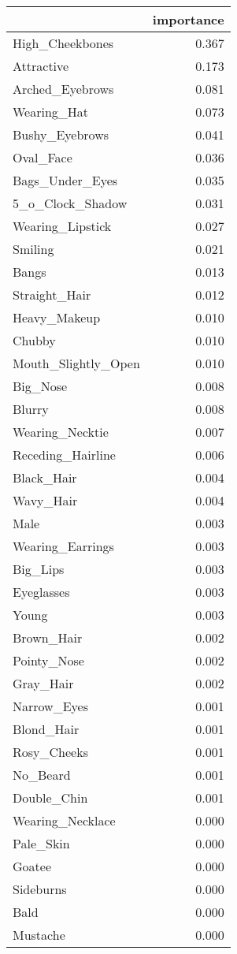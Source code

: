\begin{tabular}{lr}
\toprule
{} &  importance \\
\midrule
High\_Cheekbones     &       0.367 \\
Attractive          &       0.173 \\
Arched\_Eyebrows     &       0.081 \\
Wearing\_Hat         &       0.073 \\
Bushy\_Eyebrows      &       0.041 \\
Oval\_Face           &       0.036 \\
Bags\_Under\_Eyes     &       0.035 \\
5\_o\_Clock\_Shadow    &       0.031 \\
Wearing\_Lipstick    &       0.027 \\
Smiling             &       0.021 \\
Bangs               &       0.013 \\
Straight\_Hair       &       0.012 \\
Heavy\_Makeup        &       0.010 \\
Chubby              &       0.010 \\
Mouth\_Slightly\_Open &       0.010 \\
Big\_Nose            &       0.008 \\
Blurry              &       0.008 \\
Wearing\_Necktie     &       0.007 \\
Receding\_Hairline   &       0.006 \\
Black\_Hair          &       0.004 \\
Wavy\_Hair           &       0.004 \\
Male                &       0.003 \\
Wearing\_Earrings    &       0.003 \\
Big\_Lips            &       0.003 \\
Eyeglasses          &       0.003 \\
Young               &       0.003 \\
Brown\_Hair          &       0.002 \\
Pointy\_Nose         &       0.002 \\
Gray\_Hair           &       0.002 \\
Narrow\_Eyes         &       0.001 \\
Blond\_Hair          &       0.001 \\
Rosy\_Cheeks         &       0.001 \\
No\_Beard            &       0.001 \\
Double\_Chin         &       0.001 \\
Wearing\_Necklace    &       0.000 \\
Pale\_Skin           &       0.000 \\
Goatee              &       0.000 \\
Sideburns           &       0.000 \\
Bald                &       0.000 \\
Mustache            &       0.000 \\
\bottomrule
\end{tabular}
